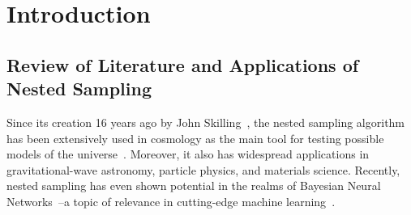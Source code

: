 
\chapter{Introduction}\label{ch:chapter1}  %

\ifpdf
    \graphicspath{{Chapter1/Figs/Raster/}{Chapter1/Figs/PDF/}{Chapter1/Figs/}}
\else
    \graphicspath{{Chapter1/Figs/Vector/}{Chapter1/Figs/}}
\fi




\section{Review of Literature and Applications of Nested Sampling}
Since its creation 16 years ago by John Skilling~\cite{10.1214/06-BA127}, the nested sampling algorithm has been extensively used in cosmology as the main tool for testing possible models of the universe~\cite{Trotta_2008}. Moreover, it also has widespread applications in gravitational-wave astronomy, particle physics, and materials science. Recently, nested sampling has even shown potential in the realms of Bayesian Neural Networks~\cite{https://doi.org/10.48550/arxiv.2205.11151}--a topic of relevance in cutting-edge machine learning~\cite{https://doi.org/10.48550/arxiv.1801.07710}.

